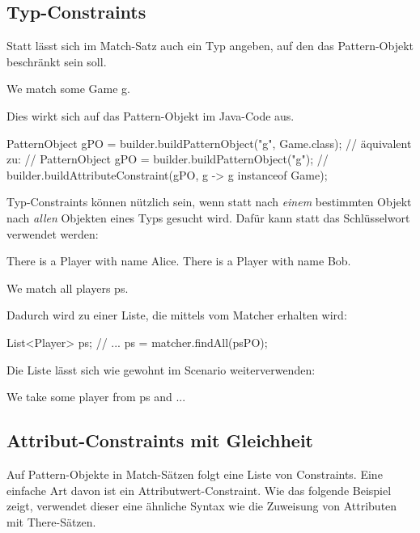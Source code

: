 \subsection{Typ-Constraints}

Statt  lässt sich im Match-Satz auch ein Typ angeben, auf den das Pattern-Objekt beschränkt sein soll.

\begin{mdcodeblock}
    We match some Game g.
\end{mdcodeblock}

Dies wirkt sich auf das Pattern-Objekt im Java-Code aus.

\begin{jcodeblock}
    PatternObject gPO = builder.buildPatternObject("g", Game.class);
    // äquivalent zu:
    // PatternObject gPO = builder.buildPatternObject("g");
    // builder.buildAttributeConstraint(gPO, g -> g instanceof Game);
\end{jcodeblock}

Typ-Constraints können nützlich sein, wenn statt nach \emph{einem} bestimmten Objekt nach \emph{allen} Objekten eines Typs gesucht wird.
Dafür kann statt  das Schlüsselwort  verwendet werden:

\begin{mdcodeblock}
    There is a Player with name Alice.
    There is a Player with name Bob.

    We match all players ps.
\end{mdcodeblock}

Dadurch wird  zu einer Liste, die mittels  vom Matcher erhalten wird:

\begin{jcodeblock}
    List<Player> ps;
    {
        // ...
        ps = matcher.findAll(psPO);
    }
\end{jcodeblock}

Die Liste lässt sich wie gewohnt im Scenario weiterverwenden:

\begin{mdcodeblock}
    We take some player from ps and ...
\end{mdcodeblock}

\subsection{Attribut-Constraints mit Gleichheit}

Auf Pattern-Objekte in Match-Sätzen folgt eine Liste von Constraints.
Eine einfache Art davon ist ein Attributwert-Constraint.
Wie das folgende Beispiel zeigt, verwendet dieser eine ähnliche Syntax wie die Zuweisung von Attributen mit There-Sätzen.

